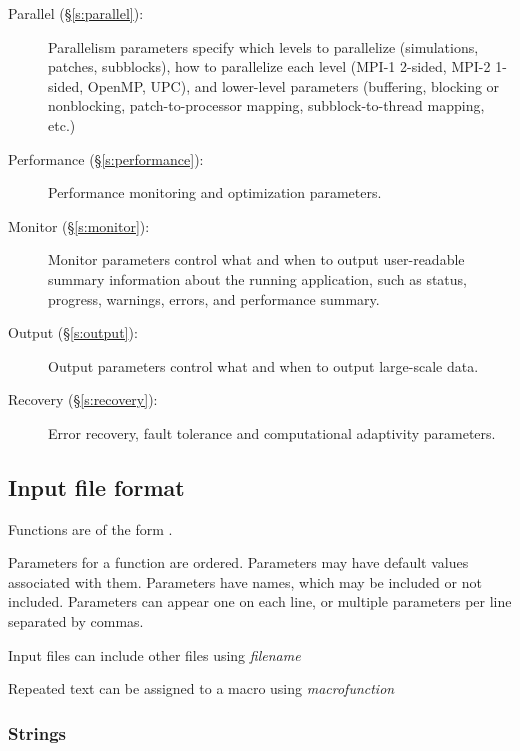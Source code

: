 \documentclass{book}
\begin{document}
\begin{description}
 \item [Parallel (\S\ref{s:parallel}): ] Parallelism parameters
 specify which levels to parallelize (simulations, patches,
 subblocks), how to parallelize each level (MPI-1 2-sided, MPI-2
 1-sided, OpenMP, UPC), and lower-level parameters (buffering,
 blocking or nonblocking, patch-to-processor mapping,
 subblock-to-thread mapping, etc.)

 \item [Performance (\S\ref{s:performance}): ] Performance monitoring
 and optimization parameters.

 \item [Monitor (\S\ref{s:monitor}): ] Monitor parameters control what
 and when to output user-readable summary information about the
 running application, such as status, progress, warnings, errors, and
 performance summary.

 \item [Output (\S\ref{s:output}): ] Output parameters control
  what and when to output large-scale data.



 \item [Recovery (\S\ref{s:recovery}): ] Error recovery, fault tolerance
 and computational adaptivity parameters.


  

\end{description}

\subsection{Input file format}

Functions are of the form .

Parameters for a function are ordered.  Parameters may have default
values associated with them.  Parameters have names, which may be
included or not included.  Parameters can appear one on each line, or
multiple parameters per line separated by commas.

Input files can include other files using \textit{filename}

Repeated text can be assigned to a macro using \textit{macro}\code{ = }\textit{function}

\subsubsection{Strings}
\end{document}
